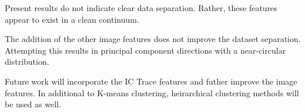 \documentclass[10pt]{article}
\begin{document}
Present results do not indicate clear data separation.
Rather, these features appear to exist in a clean continuum.

The addition of the other image features does not improve the dataset separation.
Attempting this results in principal component directions with a near-circular distribution.

Future work will incorporate the IC Trace features and futher improve the image features.
In additional to K-means clustering, heirarchical clustering methods will be used as well.



\printbibliography
\end{document}
